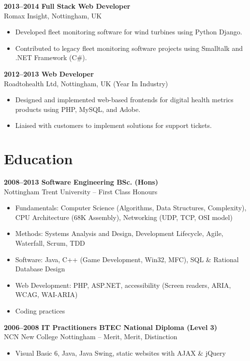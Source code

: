 \documentclass{article}
\begin{document}
\textbf{2013–2014 Full Stack Web Developer} \\
Romax Insight, Nottingham, UK
\begin{itemize}
    \item Developed fleet monitoring software for wind turbines using Python Django.
    \item Contributed to legacy fleet monitoring software projects using Smalltalk and .NET Framework (C\#).
\end{itemize}

\textbf{2012–2013 Web Developer} \\
Roadtohealth Ltd, Nottingham, UK (Year In Industry)
\begin{itemize}
    \item Designed and implemented web-based frontends for digital health metrics products using PHP, MySQL, and Adobe.
    \item Liaised with customers to implement solutions for support tickets.
\end{itemize}

\section*{Education}

\textbf{2008–2013 Software Engineering BSc. (Hons)} \\
Nottingham Trent University – First Class Honours
\begin{itemize}
    \item Fundamentals: Computer Science (Algorithms, Data Structures, Complexity), CPU Architecture (68K Assembly), Networking (UDP, TCP, OSI model)
    \item Methods: Systems Analysis and Design, Development Lifecycle, Agile, Waterfall, Scrum, TDD
    \item Software: Java, C++ (Game Development, Win32, MFC), SQL \& Rational Database Design
    \item Web Development: PHP, ASP.NET, accessibility (Screen readers, ARIA, WCAG, WAI-ARIA)
    \item Coding practices
\end{itemize}

\textbf{2006–2008 IT Practitioners BTEC National Diploma (Level 3)} \\
NCN New College Nottingham – Merit, Merit, Distinction
\begin{itemize}
    \item Visual Basic 6, Java, Java Swing, static websites with AJAX \& jQuery
\end{itemize}
\end{document}
